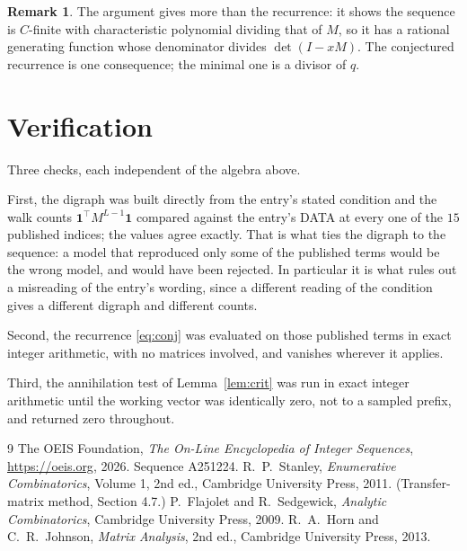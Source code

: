 \documentclass[11pt,a4paper]{article}
\theoremstyle{plain}
\theoremstyle{definition}
\newtheorem{remark}[theorem]{Remark}
\begin{document}
\begin{remark}
The argument gives more than the recurrence: it shows the sequence is $C$-finite with
characteristic polynomial dividing that of $M$, so it has a rational generating function
whose denominator divides $\det(I-xM)$. The conjectured recurrence is one consequence; the
minimal one is a divisor of $q$.
\end{remark}

\section{Verification}

Three checks, each independent of the algebra above.

First, the digraph was built directly from the entry's stated condition and the walk counts
$\mathbf{1}^{\!\top}M^{L-1}\mathbf{1}$ compared against the entry's DATA at
every one of the $15$ published indices; the values agree exactly. That is what ties
the digraph to the sequence: a model that reproduced only some of the published terms would
be the wrong model, and would have been rejected. In particular it is what rules out a
misreading of the entry's wording, since a different reading of the condition gives a
different digraph and different counts.

Second, the recurrence \eqref{eq:conj} was evaluated on those published terms in exact
integer arithmetic, with no matrices involved, and vanishes wherever it applies.

Third, the annihilation test of Lemma~\ref{lem:crit} was run in exact integer arithmetic
until the working vector was identically zero, not to a sampled prefix, and returned zero
throughout.

\begin{thebibliography}{9}
 The OEIS Foundation, \emph{The On-Line Encyclopedia of Integer
Sequences}, \url{https://oeis.org}, 2026. Sequence A251224.
 R.~P.~Stanley, \emph{Enumerative Combinatorics}, Volume 1, 2nd ed.,
Cambridge University Press, 2011. (Transfer-matrix method, Section 4.7.)
 P.~Flajolet and R.~Sedgewick, \emph{Analytic Combinatorics}, Cambridge
University Press, 2009.
 R.~A.~Horn and C.~R.~Johnson, \emph{Matrix Analysis}, 2nd ed., Cambridge
University Press, 2013.
\end{thebibliography}
\end{document}
